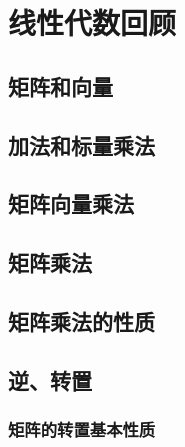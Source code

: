 \documentclass[../main.tex]{subfiles}
\begin{document}
\chapter{线性代数回顾}
\section{矩阵和向量}
\section{加法和标量乘法}


\section{矩阵向量乘法}


\section{矩阵乘法}

\section{矩阵乘法的性质}

\section{逆、转置}

\subsection{矩阵的转置基本性质}
\end{document}
